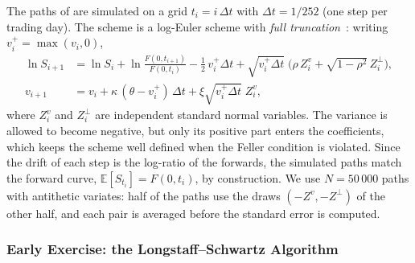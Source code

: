 \documentclass[11pt,a4paper]{article}
\theoremstyle{remark}
\newcommand{\E}{\mathbb{E}}
\begin{document}
The paths of are simulated on a grid
$t_i = i\,\Delta t$ with $\Delta t = 1/252$ (one step per trading day). The
scheme is a log-Euler scheme with \emph{full truncation}~\cite{Lord2010}:
writing $v_i^+ = \max(v_i, 0)$,
\begin{equation}
\begin{aligned}
  \ln S_{i+1} &= \ln S_i + \ln\frac{F(0,t_{i+1})}{F(0,t_i)} - \tfrac{1}{2}\,v_i^+\Delta t
                 + \sqrt{v_i^+\Delta t}\;\bigl(\rho\,Z^v_i + \sqrt{1-\rho^2}\,Z^\perp_i\bigr), \\
  v_{i+1} &= v_i + \kappa\,(\theta - v_i^+)\,\Delta t + \xi\sqrt{v_i^+\Delta t}\;Z^v_i,
\end{aligned}
\label{eq:full-truncation}
\end{equation}
where $Z^v_i$ and $Z^\perp_i$ are independent standard normal variables. The
variance is allowed to become negative, but only its positive part enters the
coefficients, which keeps the scheme well defined when the Feller condition is
violated. Since the drift of each step is the log-ratio of the forwards, the
simulated paths match the forward curve, $\E[S_{t_i}] = F(0,t_i)$, by
construction. We use $N = 50\,000$ paths with antithetic variates: half of the
paths use the draws $(-Z^v, -Z^\perp)$ of the other half, and each pair is
averaged before the standard error is computed.

\subsubsection{Early Exercise: the Longstaff--Schwartz Algorithm}
\end{document}
